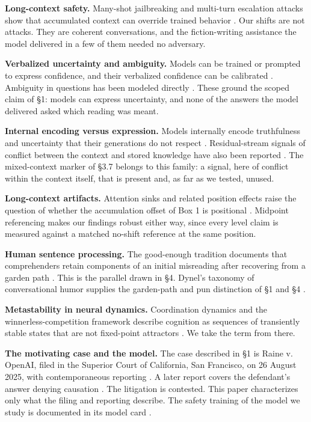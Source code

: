 \documentclass[11pt]{article}
\begin{document}
\textbf{Long-context safety.} Many-shot jailbreaking and multi-turn escalation attacks
show that accumulated context can override trained behavior \citep{anil2024,russinovich2025}. Our shifts are not attacks. They are coherent conversations, and the fiction-writing assistance the model delivered in a few of them needed no adversary.

\textbf{Verbalized uncertainty and ambiguity.} Models can be trained or prompted to
express confidence, and their verbalized confidence can be calibrated \citep{kadavath2022,lin2022,xiong2024}. Ambiguity in questions has been modeled
directly \citep{liu2023ambiguity}. These ground the scoped claim of \S1: models can express uncertainty, and none of the answers the model delivered asked which reading was meant.

\textbf{Internal encoding versus expression.} Models internally encode truthfulness and
uncertainty that their generations do not respect \citep{azaria2023,orgad2025}. Residual-stream signals of conflict between the context and stored knowledge
have also been reported \citep{zhao2024conflict}. The mixed-context marker of \S3.7 belongs to this family: a signal, here of
conflict within the context itself, that is present and, as far as we tested,
unused.

\textbf{Long-context artifacts.} Attention sinks and related position effects raise the
question of whether the accumulation offset of Box 1 is positional \citep{xiao2024sinks}. Midpoint referencing makes our findings robust either way, since every level
claim is measured against a matched no-shift reference at the same position.

\textbf{Human sentence processing.} The good-enough tradition documents that
comprehenders retain components of an initial misreading after recovering from a
garden path \citep{christianson2001,slattery2013,vanschijndel2021}. This is the parallel drawn in \S4. Dynel's taxonomy of conversational humor supplies
the garden-path and pun distinction of \S1 and \S4 \citep{dynel2009}.

\textbf{Metastability in neural dynamics.} Coordination dynamics and the
winnerless-competition framework describe cognition as sequences of transiently
stable states that are not fixed-point attractors \citep{kelso1995,rabinovich2008,rabinovich2001,sussillo2013}. We take the term from there.

\textbf{The motivating case and the model.} The case described in \S1 is Raine v. OpenAI, filed in the Superior Court of
California, San Francisco, on 26 August 2025, with contemporaneous reporting \citep{raine2025complaint,cnn2025,nbc2025aug}. A later report covers the defendant's answer
denying causation \citep{openai2025answer,nbc2025nov,techcrunch2025}. The litigation is contested.
This paper characterizes only what the filing and reporting describe. The safety training of the model we study is
documented in its model card \citep{openai2025gptoss}.
\end{document}
